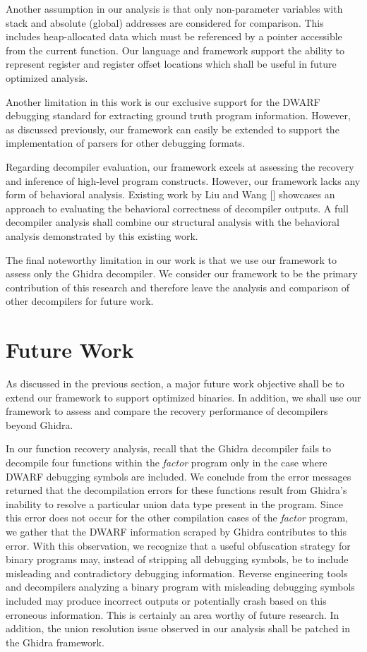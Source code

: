 Another assumption in our analysis is that only non-parameter variables with stack and absolute (global) addresses are considered for comparison. This includes heap-allocated data which must be referenced by a pointer accessible from the current function. Our language and framework support the ability to represent register and register offset locations which shall be useful in future optimized analysis.

Another limitation in this work is our exclusive support for the DWARF debugging standard for extracting ground truth program information. However, as discussed previously, our framework can easily be extended to support the implementation of parsers for other debugging formats.

Regarding decompiler evaluation, our framework excels at assessing the recovery and inference of high-level program constructs. However, our framework lacks any form of behavioral analysis. Existing work by Liu and Wang [] showcases an approach to evaluating the behavioral correctness of decompiler outputs. A full decompiler analysis shall combine our structural analysis with the behavioral analysis demonstrated by this existing work.

The final noteworthy limitation in our work is that we use our framework to assess only the Ghidra decompiler. We consider our framework to be the primary contribution of this research and therefore leave the analysis and comparison of other decompilers for future work.

\section{Future Work}

As discussed in the previous section, a major future work objective shall be to extend our framework to support optimized binaries. In addition, we shall use our framework to assess and compare the recovery performance of decompilers beyond Ghidra.

In our function recovery analysis, recall that the Ghidra decompiler fails to decompile four functions within the \emph{factor} program only in the case where DWARF debugging symbols are included. We conclude from the error messages returned that the decompilation errors for these functions result from Ghidra's inability to resolve a particular union data type present in the program. Since this error does not occur for the other compilation cases of the \emph{factor} program, we gather that the DWARF information scraped by Ghidra contributes to this error. With this observation, we recognize that a useful obfuscation strategy for binary programs may, instead of stripping all debugging symbols, be to include misleading and contradictory debugging information. Reverse engineering tools and decompilers analyzing a binary program with misleading debugging symbols included may produce incorrect outputs or potentially crash based on this erroneous information. This is certainly an area worthy of future research. In addition, the union resolution issue observed in our analysis shall be patched in the Ghidra framework.

